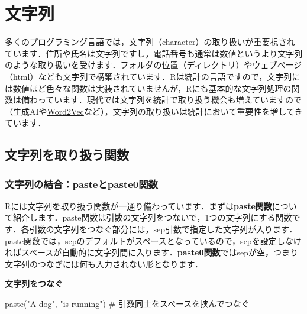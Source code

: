 \documentclass[
  letterpaper,
  DIV=11,
  numbers=noendperiod]{scrreprt}
\newenvironment{Shaded}{\begin{snugshade}}{\end{snugshade}}
\newcommand{\CommentTok}[1]{\textcolor[rgb]{0.37,0.37,0.37}{#1}}
\newcommand{\FunctionTok}[1]{\textcolor[rgb]{0.28,0.35,0.67}{#1}}
\newcommand{\NormalTok}[1]{\textcolor[rgb]{0.00,0.23,0.31}{#1}}
\newcommand{\StringTok}[1]{\textcolor[rgb]{0.13,0.47,0.30}{#1}}
\begin{document}

\hypertarget{ux6587ux5b57ux5217}{%
\chapter{文字列}\label{ux6587ux5b57ux5217}}

多くのプログラミング言語では，文字列（character）の取り扱いが重要視されています．住所や氏名は文字列ですし，電話番号も通常は数値というより文字列のような取り扱いを受けます．フォルダの位置（ディレクトリ）やウェブページ（html）なども文字列で構築されています．Rは統計の言語ですので，文字列には数値ほど色々な関数は実装されていませんが，Rにも基本的な文字列処理の関数は備わっています．現代では文字列を統計で取り扱う機会も増えていますので（生成AIや\href{https://ja.wikipedia.org/wiki/Word2vec}{Word2Vec}など），文字列の取り扱いは統計において重要性を増してきています．

\hypertarget{ux6587ux5b57ux5217ux3092ux53d6ux308aux6271ux3046ux95a2ux6570}{%
\section{文字列を取り扱う関数}\label{ux6587ux5b57ux5217ux3092ux53d6ux308aux6271ux3046ux95a2ux6570}}

\hypertarget{ux6587ux5b57ux5217ux306eux7d50ux5408pasteux3068paste0ux95a2ux6570}{%
\subsection{文字列の結合：pasteとpaste0関数}\label{ux6587ux5b57ux5217ux306eux7d50ux5408pasteux3068paste0ux95a2ux6570}}

Rには文字列を取り扱う関数が一通り備わっています．まずは\textbf{paste関数}について紹介します．paste関数は引数の文字列をつないで，1つの文字列にする関数です．各引数の文字列をつなぐ部分には，sep引数で指定した文字列が入ります．paste関数では，sepのデフォルトがスペースとなっているので，sepを設定しなければスペースが自動的に文字列間に入ります．\textbf{paste0関数}ではsepが空，つまり文字列のつなぎには何も入力されない形となります．

\textbf{文字列をつなぐ}

\begin{Shaded}
\begin{Highlighting}[]
\FunctionTok{paste}\NormalTok{(}\StringTok{"A dog"}\NormalTok{, }\StringTok{"is running"}\NormalTok{) }\CommentTok{\# 引数同士をスペースを挟んでつなぐ}
\end{Highlighting}
\end{Shaded}
\end{document}
